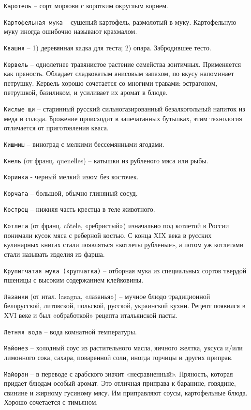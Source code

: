 {\tt Каротель} – сорт моркови с коротким округлым корнем.

{\tt Картофельная мука} – сушеный картофель, размолотый в муку. Картофельную муку иногда ошибочно называют крахмалом.

{\tt Квашня} – 1) деревянная кадка для теста; 2) опара. Забродившее тесто.

{\tt Кервель} – однолетнее травянистое растение семейства зонтичных. Применяется как пряность. Обладает сладковатым анисовым запахом, по вкусу напоминает петрушку. Кервель хорошо сочетается со многими травами: эстрагоном, петрушкой, базиликом, и усиливает их аромат в блюде.

{\tt Кислые щи} – старинный русский сильногазированный безалкогольный напиток из меда и солода. Брожение происходит в запечатанных бутылках, этим технология отличается от приготовления кваса.

{\tt Кишмиш} – виноград с мелкими бессемянными ягодами. 

{\tt Кнель} (от франц. quenelles) – катышки из рубленого мяса или рыбы.

{\tt Коринка} - черный мелкий изюм без косточек. 

{\tt Корчага} – большой, обычно глиняный сосуд. 

{\tt Кострец} – нижняя часть крестца в теле животного.

{\tt Котлета} (от франц. côtele, «ребристый») изначально под котлетой в России понимали кусок мяса с реберной костью. С конца XIX века в русских кулинарных книгах стали появляться «котлеты рубленые», а потом уж котлетами стали называть изделия из фарша.

{\tt Крупитчатая мука (крупчатка)} – отборная мука из специальных сортов твердой пшеницы с высоким содержанием клейковины.

{\tt Лазанки} (от итал. lasagna, «лазанья») – мучное блюдо традиционной белорусской, литовской, польской, русской, украинской кухни. Рецепт появился в XVI веке и был «обработкой» рецепта итальянской пасты.

{\tt Летняя вода} – вода комнатной температуры.

{\tt Майонез} – холодный соус из растительного масла, яичного желтка, уксуса и/или лимонного сока, сахара, поваренной соли, иногда горчицы и других приправ.

{\tt Майоран} – в переводе с арабского значит «несравненный». Пряность, которая придает блюдам особый аромат. Это отличная приправа к баранине, говядине, свинине и жирному гусиному мясу. Им приправляют соусы, картофельные блюда. Хорошо сочетается с тимьяном.

